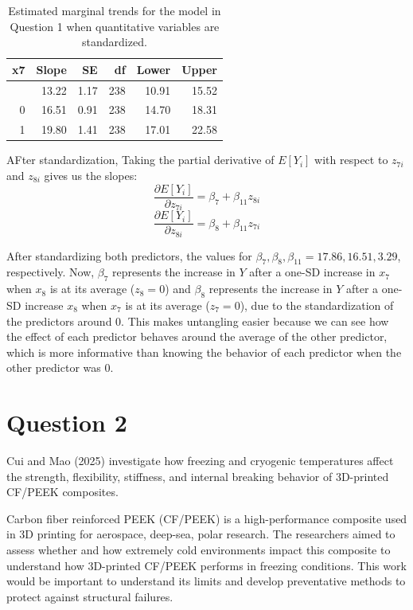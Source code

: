 \documentclass[
]{article}
\begin{document}
{

\begin{longtable}[]{@{}rrrrrr@{}}

\caption{\label{tbl-q1-emtrends-z8}Estimated marginal trends for the
model in Question 1 when quantitative variables are standardized.}

\tabularnewline

\toprule\noalign{}
x7 & Slope & SE & df & Lower & Upper \\
\midrule\noalign{}
\endhead
\bottomrule\noalign{}
\endlastfoot
-1 & 13.22 & 1.17 & 238 & 10.91 & 15.52 \\
0 & 16.51 & 0.91 & 238 & 14.70 & 18.31 \\
1 & 19.80 & 1.41 & 238 & 17.01 & 22.58 \\

\end{longtable}

}

\normalsize

AFter standardization, Taking the partial derivative of \(E[Y_i]\) with
respect to \(z_{7i}\) and \(z_{8i}\) gives us the slopes:
\[\frac{\partial E[Y_i]}{\partial z_{7i}} = \beta_7 + \beta_{11} z_{8i}\]
\[\frac{\partial E[Y_i]}{\partial z_{8i}} = \beta_8 + \beta_{11} z_{7i}\]

After standardizing both predictors, the values for
\(\beta_7, \beta_8, \beta_{11} = 17.86, 16.51, 3.29\), respectively.
Now, \(\beta_7\) represents the increase in \(Y\) after a one-SD
increase in \(x_7\) when \(x_8\) is at its average (\(z_8 = 0\)) and
\(\beta_8\) represents the increase in \(Y\) after a one-SD increase
\(x_8\) when \(x_7\) is at its average (\(z_7 = 0\)), due to the
standardization of the predictors around 0. This makes untangling easier
because we can see how the effect of each predictor behaves around the
average of the other predictor, which is more informative than knowing
the behavior of each predictor when the other predictor was 0.

\section{Question 2}\label{question-2}

Cui and Mao (2025) investigate how freezing and cryogenic temperatures
affect the strength, flexibility, stiffness, and internal breaking
behavior of 3D-printed CF/PEEK composites.

Carbon fiber reinforced PEEK (CF/PEEK) is a high-performance composite
used in 3D printing for aerospace, deep-sea, polar research. The
researchers aimed to assess whether and how extremely cold environments
impact this composite to understand how 3D-printed CF/PEEK performs in
freezing conditions. This work would be important to understand its
limits and develop preventative methods to protect against structural
failures.
\end{document}
